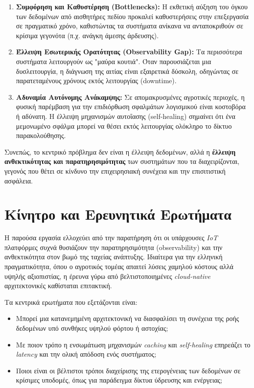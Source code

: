 \begin{enumerate}
	\item \textbf{Συμφόρηση και Καθυστέρηση (Bottlenecks):} Η εκθετική αύξηση
	      του όγκου των δεδομένων από αισθητήρες πεδίου προκαλεί
	      καθυστερήσεις στην επεξεργασία σε πραγματικό χρόνο, καθιστώντας τα
	      συστήματα ανίκανα να ανταποκριθούν σε κρίσιμα γεγονότα (π.χ. ανάγκη
	      άμεσης άρδευσης).
	\item \textbf{Έλλειψη Εσωτερικής Ορατότητας (Observability Gap):} Τα
	      περισσότερα συστήματα λειτουργούν ως "μαύρα κουτιά". Όταν
	      παρουσιάζεται μια δυσλειτουργία, η διάγνωση της αιτίας είναι
	      εξαιρετικά δύσκολη, οδηγώντας σε παρατεταμένους χρόνους εκτός
	      λειτουργίας (downtime).
	\item \textbf{Αδυναμία Αυτόνομης Ανάκαμψης:} Σε απομακρυσμένες αγροτικές
	      περιοχές, η φυσική παρέμβαση για την επιδιόρθωση σφαλμάτων
	      λογισμικού είναι κοστοβόρα ή αδύνατη. Η έλλειψη μηχανισμών
	      αυτοΐασης (self-healing) σημαίνει ότι ένα μεμονωμένο σφάλμα μπορεί
	      να θέσει εκτός λειτουργίας ολόκληρο το δίκτυο παρακολούθησης.
\end{enumerate}

Συνεπώς, το κεντρικό πρόβλημα δεν είναι η έλλειψη δεδομένων, αλλά η
\textbf{έλλειψη ανθεκτικότητας και παρατηρησιμότητας} των συστημάτων που τα
διαχειρίζονται, γεγονός που θέτει σε κίνδυνο την επιχειρησιακή συνέχεια και την
επισιτιστική ασφάλεια.

\section{Κίνητρο και Ερευνητικά Ερωτήματα}

Η παρούσα εργασία ελλοχεύει από την παρατήρηση ότι οι υπάρχουσες \textit{IoT}
πλατφόρμες συχνά θυσιάζουν την παρατηρησιμότητα (observability) και την
ανθεκτικότητα στον βωμό της ταχείας ανάπτυξης. Ιδιαίτερα για την ελληνική
πραγματικότητα, όπου ο αγροτικός τομέας απαιτεί λύσεις χαμηλού κόστους αλλά
υψηλής αξιοπιστίας, η έρευνα γύρω από βελτιστοποιημένες \textit{cloud-native}
αρχιτεκτονικές καθίσταται επιτακτική.

Τα κεντρικά ερωτήματα που εξετάζονται είναι:

\begin{itemize}
	\item Μπορεί μια κατανεμημένη αρχιτεκτονική να διασφαλίσει τη
	      συνέχεια της ροής δεδομένων υπό συνθήκες υψηλού φόρτου ή
	      αστοχίας;
	\item Με ποιον τρόπο η ενσωμάτωση μηχανισμών \textit{caching} και
	      \textit{self-healing} επηρεάζει το \textit{latency} και την
	      ολική απόδοση ενός συστήματος;
	\item Ποιοι είναι οι βέλτιστοι τρόποι διαχείρισης της ετερογένειας των
	      δεδομένων σε κρίσιμες υποδομές, όπως για παράδειγμα δίκτυα
	      ύδρευσης και ενέργειας;
\end{itemize}

